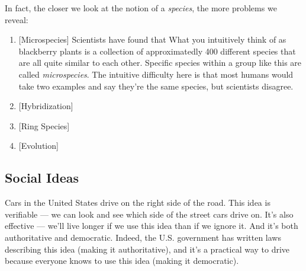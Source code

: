 \documentclass[11pt, oneside]{article}   	%
\begin{document}
In fact, the closer we look at the notion of a {\em species}, the more problems
we reveal:
\begin{enumerate}
    \item{} [Microspecies] Scientists have found that  What you intuitively
        think of as blackberry plants is a collection of approximatedly 400
        different species that are all quite similar to each other. Specific
        species within a group like this are called {\em microspecies}.
        The intuitive difficulty here is that most humans would take two
        examples and say they're the same species, but scientists disagree.
    \item{} [Hybridization] 
    \item{} [Ring Species]
    \item{} [Evolution]
\end{enumerate}










\subsection{Social Ideas}

%
%

Cars in the United States drive on the right side of the road.
This idea is verifiable --- we can look and see which side of the street cars
drive on.
It's also effective --- we'll live
longer if we use this idea than if we ignore it.
And it's both authoritative and democratic. Indeed, the U.S.
government has written laws describing this idea (making it authoritative),
and it's a practical
way to drive
because everyone knows to use this idea (making it democratic).
\end{document}
